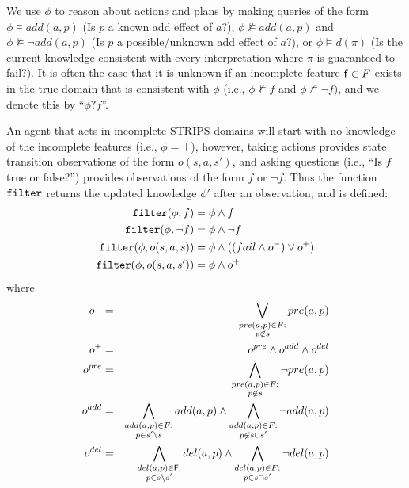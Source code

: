 \documentclass{article}
\begin{document}
We use $\phi$ to reason about actions and
plans by making queries of the form $\phi \models
add({a}, p)$ (Is $p$ a known add effect of
${a}$?), $\phi \not\models add({a}, p)$ and $\phi
\not \models \neg add({a}, p)$  (Is $p$ a
possible/unknown add effect of ${a}$?),  or $\phi \models d(\pi)$ (Is the
current knowledge consistent with every interpretation where $\pi$ is guaranteed
to fail?).  It is often the case that it is unknown if an incomplete feature
${\sf f} \in F$ exists in the true domain that is consistent with $\phi$ (i.e., $\phi \not\models f$ and $\phi \not\models
\neg f$), and we denote this by ``$\phi?f$''.



 An agent that acts in incomplete STRIPS domains
will start with no knowledge of the incomplete features (i.e., $\phi = \top$),
however, taking actions provides state transition observations of the form $o(s,
a, s')$, and asking questions (i.e., ``Is $f$ true or false?'') provides
observations of the form $f$ or $\neg f$.  Thus the function ${\tt filter}$
returns the updated knowledge $\phi'$ after an observation, and is
defined:
\begin{align*}
{\tt filter}(\phi, f) & = \phi \wedge f \\
{\tt filter}(\phi, \neg f) & = \phi \wedge \neg f \\
{\tt filter}(\phi, o(s, a, s)) & = \phi \wedge ((fail \wedge o^-) \vee  o^+)\\
{\tt filter}(\phi, o(s, a, s')) & = \phi \wedge  o^+
\end{align*}
 where 
\begin{eqnarray*}
o^- &=& \bigvee\limits_{\substack{pre({a},p) \in 
F:\\ p \not\in s} } pre({a},p) 
\label{eqn:update1} \\
o^+ &=& o^{pre} \wedge o^{add} \wedge o^{del}\label{eqn:update2}\\
o^{pre} &=& \bigwedge\limits_{\substack{pre({a},p)
 \in F:\\ p \not\in s} }\neg pre({a},p)
 \label{eqn:update3}  \\
o^{add} &=& \bigwedge\limits_{\substack{add({a},p) \in 
F:\\ p\in s'\backslash s} }add({a},p) 
  \wedge \bigwedge\limits_{\substack{add({a},p) \in 
  F: \\ p \not\in  s\cup s'}} \neg 
  add({a},p)   \label{eqn:update4}\\
o^{del} &=& 
\bigwedge\limits_{\substack{del({a},p) \in {\sf
F}: \\p \in s \backslash s'}}
del({a},p)  \wedge
\bigwedge\limits_{\substack{del({a},p)
\in F:\\ p \in s\cap s'}}\neg
del({a},p)  \label{eqn:update5}
\end{eqnarray*}
\end{document}
